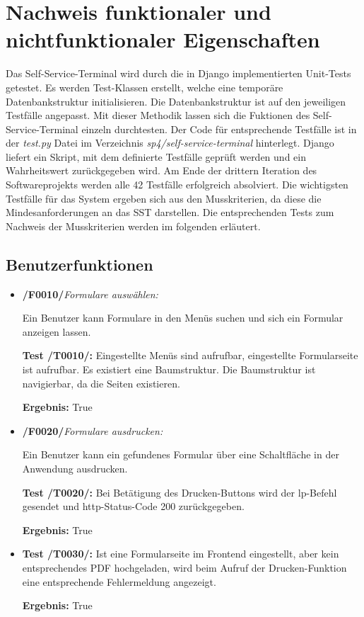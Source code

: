 \section{Nachweis funktionaler und nichtfunktionaler Eigenschaften}

Das Self-Service-Terminal wird durch die in Django implementierten Unit-Tests getestet. Es werden Test-Klassen erstellt, welche eine temporäre Datenbankstruktur initialisieren. Die Datenbankstruktur ist auf den jeweiligen Testfälle angepasst. Mit dieser Methodik lassen sich die Fuktionen des Self-Service-Terminal einzeln durchtesten. Der Code für entsprechende Testfälle ist in der \textit{test.py} Datei im Verzeichnis \textit{sp4/self-service-terminal} hinterlegt. Django liefert ein Skript, mit dem definierte Testfälle geprüft werden und ein Wahrheitswert zurückgegeben wird. Am Ende der drittern Iteration des Softwareprojekts werden alle 42 Testfälle erfolgreich absolviert. Die wichtigsten Testfälle für das System ergeben sich aus den Musskriterien, da diese die Mindesanforderungen an das SST darstellen. Die entsprechenden Tests zum Nachweis der Musskriterien werden im folgenden erläutert.

\vspace{1cm}

\subsection{Benutzerfunktionen}

\begin{itemize}
    \item \textbf{/F0010/}\textit{Formulare auswählen:} \par
    Ein Benutzer kann Formulare in den Menüs suchen und sich ein Formular anzeigen lassen.\par
    \noindent \textbf{Test /T0010/:} Eingestellte Menüs sind aufrufbar, eingestellte Formularseite ist aufrufbar. Es existiert eine Baumstruktur. Die Baumstruktur ist navigierbar, da die Seiten existieren.\par
    \noindent \textbf{Ergebnis:} True
    \newpage
    \item \textbf{/F0020/}\textit{Formulare ausdrucken:} \par
    Ein Benutzer kann ein gefundenes Formular über eine Schaltfläche in der Anwendung ausdrucken.\par
    \noindent \textbf{Test /T0020/:} Bei Betätigung des Drucken-Buttons wird der lp-Befehl gesendet und http-Status-Code 200 zurückgegeben.\par
    \noindent \textbf{Ergebnis:} True
    \item \noindent \textbf{Test /T0030/:} Ist eine Formularseite im Frontend eingestellt, aber kein entsprechendes PDF hochgeladen, wird beim Aufruf der Drucken-Funktion eine entsprechende Fehlermeldung angezeigt.\par
    \noindent \textbf{Ergebnis:} True
\end{itemize}

